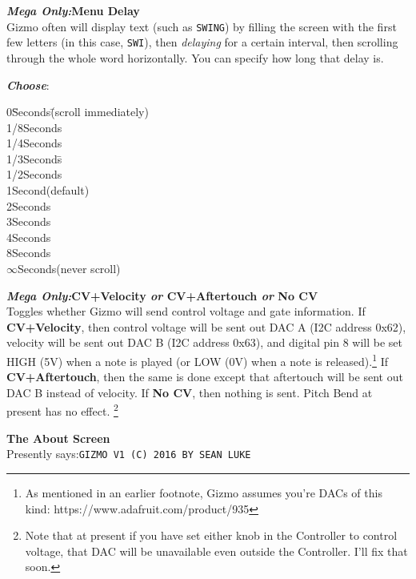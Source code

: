 \documentclass{article}
\begin{document}
\begin{description}
		
	\item{\bf \textit{Mega Only:}\quad Menu Delay}\\
		Gizmo often will display text (such as \texttt{SWING}) by filling the screen with the first few letters (in this case, \texttt{SWI}), then {\it delaying} for a certain interval, then scrolling through the whole word horizontally. You can specify how long that delay is.
		\begin{description}
			\item{\bf \textit{Choose}}:
			\begin{tabbing}
			0\hspace{2em}\=Seconds\hspace{1in}\=(scroll immediately)\\
			1/8\>Seconds\\
			1/4\>Seconds\\
			1/3\>Seconds\>\hspace{1.5in}\=\\
			1/2\>Seconds\\
			1\>Second\>(default)\\
			2\>Seconds\\
			3\>Seconds\\
			4\>Seconds\\
			8\>Seconds\\
			\(\infty\)\>Seconds\>(never scroll)\>
			\end{tabbing}
		\end{description}


	\item{\bf  \textit{Mega Only:}\quad CV+Velocity \textit{or} CV+Aftertouch \textit{or} No CV}\\
		Toggles whether Gizmo will send control voltage and gate information.  If {\bf CV+Velocity}, then control voltage will be sent out DAC A (I2C address 0x62), velocity will be sent out DAC B (I2C address 0x63), and digital pin 8 will be set HIGH (5V) when a note is played (or LOW (0V) when a note is released).\footnote{As mentioned in an earlier footnote, Gizmo assumes you're DACs of this kind: https:/\!/www.adafruit.com/product/935} If {\bf CV+Aftertouch}, then the same is done except that aftertouch will be sent out DAC B instead of velocity.  If {\bf No CV}, then nothing is sent.  Pitch Bend at present has no effect.	\footnote{Note that at present if you have set either knob in the Controller to control voltage, that DAC will be unavailable even outside the Controller.  I'll fix that soon.}
		
	\item{\bf The About Screen}\\
		Presently says:\quad \texttt{GIZMO V1 (C) 2016 BY SEAN LUKE}
	\end{description}
\end{document}
